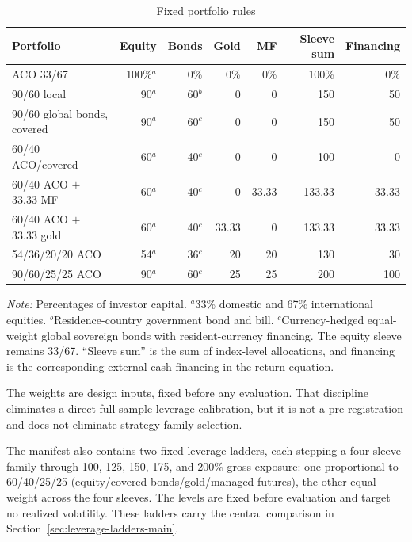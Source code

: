 \documentclass[11pt]{article}
\begin{document}
\begin{table}[t]
\centering
\caption{Fixed portfolio rules}
\label{tab:design}
\begin{tabular}{lrrrrrr}
\toprule
Portfolio & Equity & Bonds & Gold & MF & Sleeve sum & Financing \\
\midrule
ACO 33/67 & 100\%$^{a}$ & 0\% & 0\% & 0\% & 100\% & 0\% \\
90/60 local & 90$^{a}$ & 60$^{b}$ & 0 & 0 & 150 & 50 \\
90/60 global bonds, covered & 90$^{a}$ & 60$^{c}$ & 0 & 0 & 150 & 50 \\
60/40 ACO/covered & 60$^{a}$ & 40$^{c}$ & 0 & 0 & 100 & 0 \\
60/40 ACO $+$ 33.33 MF & 60$^{a}$ & 40$^{c}$ & 0 & 33.33 & 133.33 & 33.33 \\
60/40 ACO $+$ 33.33 gold & 60$^{a}$ & 40$^{c}$ & 33.33 & 0 & 133.33 & 33.33 \\
54/36/20/20 ACO & 54$^{a}$ & 36$^{c}$ & 20 & 20 & 130 & 30 \\
90/60/25/25 ACO & 90$^{a}$ & 60$^{c}$ & 25 & 25 & 200 & 100 \\
\bottomrule
\end{tabular}
\begin{minipage}{0.97\textwidth}\footnotesize
\textit{Note:} Percentages of investor capital. $^{a}$33\% domestic and 67\%
international equities. $^{b}$Residence-country government bond and bill.
$^{c}$Currency-hedged equal-weight global sovereign bonds with resident-currency
financing. The equity sleeve remains 33/67.
``Sleeve sum'' is the sum of index-level allocations,
and financing is the corresponding external cash financing in the return
equation.
\end{minipage}
\end{table}

The weights are design inputs, fixed before any evaluation. That discipline
eliminates a direct full-sample leverage
calibration, but it is not a pre-registration and does not eliminate
strategy-family selection.

The manifest also contains two fixed leverage ladders, each stepping a
four-sleeve family through 100, 125, 150, 175, and 200\% gross exposure: one
proportional to 60/40/25/25 (equity/covered bonds/gold/managed futures), the
other equal-weight across the four sleeves. The levels are fixed before
evaluation and target no realized volatility. These ladders carry the central
comparison in Section~\ref{sec:leverage-ladders-main}.
\end{document}

